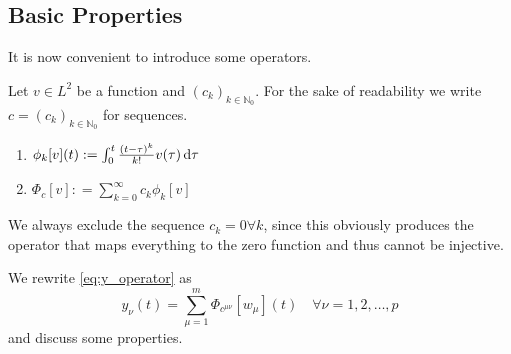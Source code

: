 \subsection{Basic Properties}
It is now convenient to introduce some operators.
\begin{definition}{}{}
	Let $v\in L^2$ be a function and $(c_k)_{k\in\mathbb{N}_0}$. For the sake of 
	readability we write 
	$c=(c_k)_{k\in\mathbb{N}_0}$ for sequences. 
	\begin{enumerate}
	\item $\phi_k[v](t):= \int_0^t \frac{(t-\tau)^k}{k!} v(\tau) \, \text{d} \tau $
	\item $\Phi_c[v] : = \sum_{k=0}^\infty c_k \phi_k[v]$
	\end{enumerate}
	We always exclude the sequence $c_k=0\forall k$, since 
	this obviously produces the operator that maps everything to the zero function and 
	thus cannot be injective.
\end{definition}
We rewrite \eqref{eq:y_operator} as
\begin{equation}
y_\nu(t) = \sum\limits_{\mu=1}^m \Phi_{c^{\mu\nu}}[w_\mu](t) 
\quad \forall \nu =1,2,\ldots , p   \label{eq:y_Phi}
\end{equation}
and discuss some properties.

